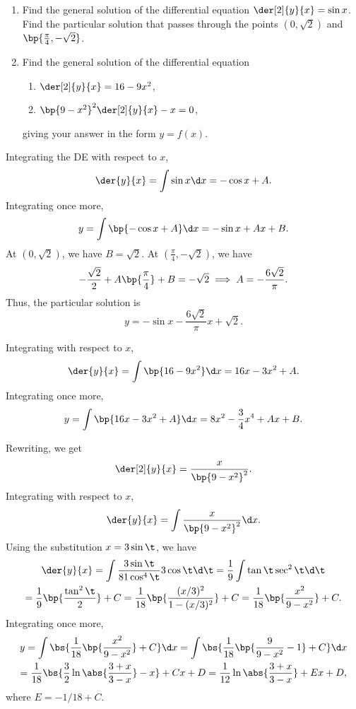 \begin{problem}
    \begin{enumerate}
        \item Find the general solution of the differential equation $\der[2]{y}{x} = \sin x$. Find the particular solution that passes through the points $(0, \sqrt2)$ and $\bp{\frac\pi4, -\sqrt2}$.
        \item Find the general solution of the differential equation
        \begin{enumerate}
            \item $\der[2]{y}{x} = 16 - 9x^2$,
            \item $\bp{9 - x^2}^2 \der[2]{y}{x} - x = 0$,
        \end{enumerate}
        giving your answer in the form $y = f(x)$.
    \end{enumerate}
\end{problem}
\begin{solution}
    \begin{ppart}
        Integrating the DE with respect to $x$, \[\der{y}{x} = \int \sin x \d x = -\cos x + A.\] Integrating once more, \[y = \int \bp{-\cos x + A} \d x = -\sin x + Ax + B.\] At $(0, \sqrt2)$, we have $B = \sqrt{2}$. At $(\frac\pi4, -\sqrt2)$, we have \[-\frac{\sqrt2}{2} + A\bp{\frac\pi4} + B = -\sqrt2 \implies A = -\frac{6\sqrt2}{\pi}.\] Thus, the particular solution is \[y = -\sin x - \frac{6\sqrt2}{\pi} x + \sqrt2.\]
    \end{ppart}
    \clearpage
    \begin{ppart}
        \begin{psubpart}
            Integrating with respect to $x$, \[\der{y}{x} = \int \bp{16 - 9x^2} \d x= 16 x - 3x^2 + A.\] Integrating once more, \[y = \int \bp{16x - 3x^2 + A} \d x = 8x^2 - \frac34 x^4 + Ax + B.\]
        \end{psubpart}
        \begin{psubpart}
            Rewriting, we get \[\der[2]{y}{x} = \frac{x}{\bp{9-x^2}^2}.\] Integrating with respect to $x$, \[\der{y}{x} = \int \frac{x}{\bp{9 - x^2}^2} \d x.\] Using the substitution $x = 3 \sin \t$, we have
            \begin{gather*}
                \der{y}{x} = \int \frac{3\sin\t}{81 \cos^4 \t} 3\cos \t \d \t = \frac19 \int \tan \t \sec^2 \t \d \t\\
                = \frac19\bp{\frac{\tan^2 \t}{2}} + C = \frac1{18}\bp{\frac{(x/3)^2}{1 - (x/3)^2}} + C = \frac1{18} \bp{\frac{x^2}{9 - x^2}} + C.
            \end{gather*}
            Integrating once more,
            \begin{gather*}
                y = \int \bs{\frac1{18} \bp{\frac{x^2}{9 - x^2}} + C} \d x = \int \bs{\frac1{18} \bp{\frac{9}{9 - x^2} - 1} + C} \d x\\
                = \frac1{18} \bs{\frac{3}{2} \ln \abs{\frac{3+x}{3-x}} - x} + Cx + D = \frac{1}{12} \ln \abs{\frac{3+x}{3-x}} + Ex + D,
            \end{gather*}
            where $E = -1/18 + C$.
        \end{psubpart}
    \end{ppart}
\end{solution}

